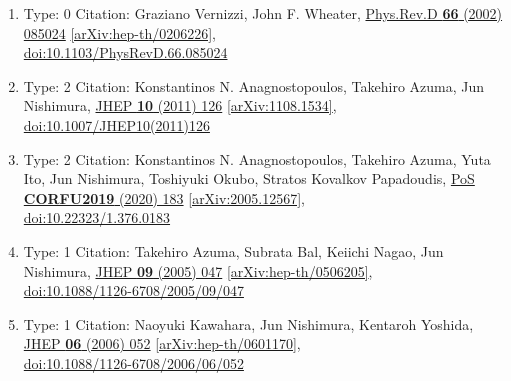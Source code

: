 \documentclass[a4paper,10pt]{article}
\begin{document}
\begin{enumerate}
\begin{enumerate}
  \item Type: 0 Citation: Graziano Vernizzi, John F. Wheater, \href{https://www.doi.org/10.1103/PhysRevD.66.085024}{Phys.Rev.D {\bf 66} (2002) 085024}  \href{https://arxiv.org/abs/hep-th/0206226}{[arXiv:hep-th/0206226]},\\\href{https://www.doi.org/10.1103/PhysRevD.66.085024}{doi:10.1103/PhysRevD.66.085024}
  \item Type: 2 Citation: Konstantinos N. Anagnostopoulos, Takehiro Azuma, Jun Nishimura, \href{https://www.doi.org/10.1007/JHEP10(2011)126}{JHEP {\bf 10} (2011) 126}  \href{https://arxiv.org/abs/1108.1534}{[arXiv:1108.1534]},\\\href{https://www.doi.org/10.1007/JHEP10(2011)126}{doi:10.1007/JHEP10(2011)126}
  \item Type: 2 Citation: Konstantinos N. Anagnostopoulos, Takehiro Azuma, Yuta Ito, Jun Nishimura, Toshiyuki Okubo, Stratos Kovalkov Papadoudis, \href{https://www.doi.org/10.22323/1.376.0183}{PoS {\bf CORFU2019} (2020) 183}  \href{https://arxiv.org/abs/2005.12567}{[arXiv:2005.12567]},\\\href{https://www.doi.org/10.22323/1.376.0183}{doi:10.22323/1.376.0183}
  \item Type: 1 Citation: Takehiro Azuma, Subrata Bal, Keiichi Nagao, Jun Nishimura, \href{https://www.doi.org/10.1088/1126-6708/2005/09/047}{JHEP {\bf 09} (2005) 047}  \href{https://arxiv.org/abs/hep-th/0506205}{[arXiv:hep-th/0506205]},\\\href{https://www.doi.org/10.1088/1126-6708/2005/09/047}{doi:10.1088/1126-6708/2005/09/047}
  \item Type: 1 Citation: Naoyuki Kawahara, Jun Nishimura, Kentaroh Yoshida, \href{https://www.doi.org/10.1088/1126-6708/2006/06/052}{JHEP {\bf 06} (2006) 052}  \href{https://arxiv.org/abs/hep-th/0601170}{[arXiv:hep-th/0601170]},\\\href{https://www.doi.org/10.1088/1126-6708/2006/06/052}{doi:10.1088/1126-6708/2006/06/052}

\end{enumerate}
\end{enumerate}
\end{document}

